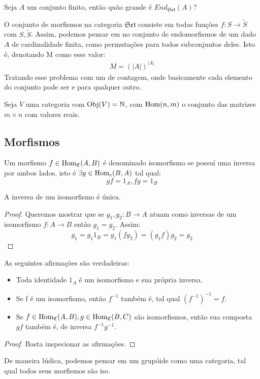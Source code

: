 \documentclass[../main]{subfiles}
\begin{document}
\begin{exercise}
    Seja \(A\) um conjunto finito, então quão grande é
    \(End_{\mathfrak{Set}}(A)\)? 
\end{exercise}
\begin{answer}
    O conjunto de morfismos na categoria \(\mathfrak{Set}\) consiste em todas
    funções \(f: S \to \tilde S\) com \(S, \tilde S\). Assim, podemos pensar em
    no conjunto de endomorfismos de um dado \(A\) de cardinalidade finita, como
    permutações para todos subconjuntos deles. Isto é, denotando M como esse
    valor:
    \begin{align*}
        M = (|A|)^{|A|}
    \end{align*} 
    Tratando esse problema com um de contagem, onde basicamente cada elemento do
    conjunto pode ser e para qualquer outro.
\end{answer}
\begin{exercise}
    Seja \(V\) uma categoria com \(\text{Obj}(V) = \mathbb N\), com \(\text{Hom}(n, m)\) o
    conjunto das matrizes \(m \times n\) com valores reais. 
\end{exercise}

\subsection{Morfismos}

\begin{definition}[Isomorfismo]
    Um morfismo \(f \in \text{Hom}_{\mathfrak{C}} (A,B)\) é denominado isomorfismo se possuí uma
    inversa por ambos lados, isto é \(\exists g \in \text{Hom}_c(B, A)\) tal qual:
    \[gf = 1_A, fg = 1_B\]
\end{definition}
\begin{prop}
    A inversa de um isomorfismo é única.
\end{prop}
\begin{proof}
    Queremos mostrar que se \(g_1, g_2: B \to A\) atuam como inversas de um
    isomorfismo \(f: A \to B\) então \(g_1 = g_2\). Assim:
    \[g_1 = g_1 1_B = g_1(fg_2) = (g_1f)g_2 = g_2\]
\end{proof}
\begin{prop}
    As seguintes afirmações são verdadeiras:
    \begin{itemize}
        \item Toda identidade \(1_A\) é um isomorfismo e sua própria inversa.
        \item Se f é um isomorfismo, então \(f^{-1}\) também é, tal qual
        \((f^{-1})^{-1} = f\).
        \item Se \(f \in \text{Hom}_{\mathfrak{C}} (A, B), g \in \text{Hom}_{\mathfrak{C}} (B, C)\) são
        isomorfismos, então sua composta \(gf\) também é, de inversa
        \(f^{-1}g^{-1}\).
    \end{itemize}
\end{prop}
\begin{proof}
    Basta inspecionar as afirmações.
\end{proof}
\begin{example}[Grupóide]
    De maneira lúdica, podemos pensar em um grupóide como uma categoria, tal
    qual todos seus morfismos são iso.
\end{example}
\end{document}
